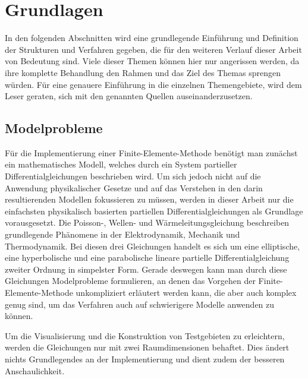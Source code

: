 \documentclass[crop=false]{standalone}
\begin{document}
  \section{Grundlagen} %
  \label{sec:background}

    In den folgenden Abschnitten wird eine grundlegende Einführung und Definition der Strukturen und Verfahren gegeben, die für den weiteren Verlauf dieser Arbeit von Bedeutung sind.
    Viele dieser Themen können hier nur angerissen werden, da ihre komplette Behandlung den Rahmen und das Ziel des Themas sprengen würden.
    Für eine genauere Einführung in die einzelnen Themengebiete, wird dem Leser geraten, sich mit den genannten Quellen auseinanderzusetzen.

    \subsection{Modelprobleme} %
    \label{sub:modelprobleme}

      Für die Implementierung einer Finite-Elemente-Methode benötigt man zunächst ein mathematisches Modell, welches durch ein System partieller Differentialgleichungen beschrieben wird.
      Um sich jedoch nicht auf die Anwendung physikalischer Gesetze und auf das Verstehen in den darin resultierenden Modellen fokussieren zu müssen, werden in dieser Arbeit nur die einfachsten physikalisch basierten partiellen Differentialgleichungen als Grundlage vorausgesetzt.
      Die Poisson-, Wellen- und Wärmeleitungsgleichung beschreiben grundlegende Phänomene in der Elektrodynamik, Mechanik und Thermodynamik.
      Bei diesen drei Gleichungen handelt es sich um eine elliptische, eine hyperbolische und eine parabolische lineare partielle Differentialgleichung zweiter Ordnung in simpelster Form.
      Gerade deswegen kann man durch diese Gleichungen Modelprobleme formulieren, an denen das Vorgehen der Finite-Elemente-Methode unkompliziert erläutert werden kann, die aber auch komplex genug sind, um das Verfahren auch auf schwierigere Modelle anwenden zu können.
      \cite{Schweizer2013,Alberty1998,Logan2007}

      Um die Visualisierung und die Konstruktion von Testgebieten zu erleichtern, werden die Gleichungen nur mit zwei Raumdimensionen behaftet.
      Dies ändert nichts Grundlegendes an der Implementierung und dient zudem der besseren Anschaulichkeit.
\end{document}
